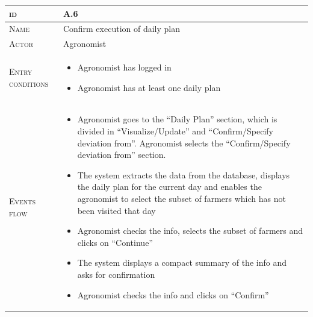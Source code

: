

\begin{table}[H]
    \centering
    \begin{tabular}[c]{|l|p{}|}
        \hline %
    	\textsc{id}                 &   A.6\\
    	\hline %
    	\textsc{Name}               &   Confirm execution of daily plan\\
    	\hline %
    	\textsc{Actor}             &   Agronomist\\
    	\hline %
    	\textsc{Entry conditions}   &   \begin{itemize}
                                    	    \item Agronomist has logged in
                                    	    \item Agronomist has at least one daily plan
                                        \end{itemize}\\
    	\hline %
    	\textsc{Events flow}         &   %
            	                        \begin{itemize}
                                    	    \item Agronomist goes to the “Daily Plan” section, which is divided in “Visualize/Update” and “Confirm/Specify deviation from”. Agronomist selects the “Confirm/Specify deviation from” section.
                                    		\item The system extracts the data from the database, displays the daily plan for the current day and enables the agronomist to select the subset of farmers which has not been visited that day
                                            \item Agronomist checks the info, selects the subset of farmers and clicks on “Continue”
                                            \item The system displays a compact summary of the info and asks for confirmation
                                            \item Agronomist checks the info and clicks on “Confirm”


\end{itemize}
\end{tabular}
\end{table}
